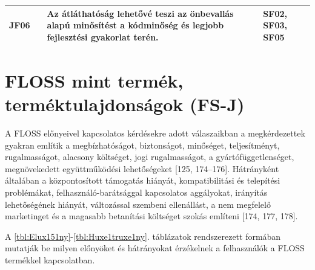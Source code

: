 \documentclass[12pt,magyar,a4paper,oneside]{scrreprt}
\begin{document}
\begin{longtable}[]{@{}rcll@{}}
\begin{minipage}[t]{0.03\columnwidth}
JF06\strut
\end{minipage} & \begin{minipage}[t]{0.03\columnwidth}\centering
1\strut
\end{minipage} & \begin{minipage}[t]{0.69\columnwidth}\raggedright
Az átláthatóság lehetővé teszi az önbevallás alapú minősítést a
kódminőség és legjobb fejlesztési gyakorlat terén.\strut
\end{minipage} & \begin{minipage}[t]{0.13\columnwidth}\raggedright
SF02, SF03, SF05\strut
\end{minipage}\tabularnewline
\bottomrule
\end{longtable}

\hypertarget{floss-mint-termuxe9k-termuxe9ktulajdonsuxe1gok-fs-j}{%
\section{FLOSS mint termék, terméktulajdonságok
(FS-J)}\label{floss-mint-termuxe9k-termuxe9ktulajdonsuxe1gok-fs-j}}

A FLOSS előnyeivel kapcsolatos kérdésekre adott válaszaikban a
megkérdezettek gyakran említik a megbízhatóságot, biztonságot,
minőséget, teljesítményt, rugalmasságot, alacsony költséget, jogi
rugalmasságot, a gyártófüggetlenséget, megnövekedett együttműködési
lehetőségeket {[}125, 174--176{]}. Hátrányként általában a
központosított támogatás hiányát, kompatibilitási és telepítési
problémákat, felhasználó-barátsággal kapcsolatos aggályokat, irányítás
lehetőségének hiányát, változással szembeni ellenállást, a nem megfelelő
marketinget és a magasabb betanítási költséget szokás említeni {[}174,
177, 178{]}.

A \ref{tbl:Elux151ny}-\ref{tbl:Huxe1truxe1ny}. táblázatok rendszerezett
formában mutatják be milyen előnyöket és hátrányokat érzékelnek a
felhasználók a FLOSS termékkel kapcsolatban.
\end{document}
